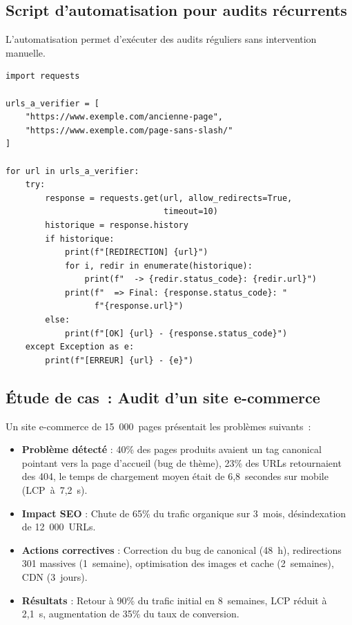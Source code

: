 \documentclass[12pt,a4paper,twoside]{report}
\begin{document}
\subsection{Script d'automatisation pour audits récurrents}

L'automatisation permet d'exécuter des audits réguliers sans intervention manuelle.

\begin{lstlisting}[style=code,caption={Script Python pour vérification automatisée des redirections}]
import requests

urls_a_verifier = [
    "https://www.exemple.com/ancienne-page",
    "https://www.exemple.com/page-sans-slash/"
]

for url in urls_a_verifier:
    try:
        response = requests.get(url, allow_redirects=True,
                                timeout=10)
        historique = response.history
        if historique:
            print(f"[REDIRECTION] {url}")
            for i, redir in enumerate(historique):
                print(f"  -> {redir.status_code}: {redir.url}")
            print(f"  => Final: {response.status_code}: "
                  f"{response.url}")
        else:
            print(f"[OK] {url} - {response.status_code}")
    except Exception as e:
        print(f"[ERREUR] {url} - {e}")
\end{lstlisting}

\subsection{Étude de cas~: Audit d'un site e-commerce}

Un site e-commerce de 15~000~pages présentait les problèmes suivants~:
\begin{itemize}
    \item \textbf{Problème détecté} : 40\% des pages produits avaient un tag canonical pointant vers la page d'accueil (bug de thème), 23\% des URLs retournaient des 404, le temps de chargement moyen était de 6,8~secondes sur mobile (LCP~à~7,2~s).
    \item \textbf{Impact SEO} : Chute de 65\% du trafic organique sur 3~mois, désindexation de 12~000~URLs.
    \item \textbf{Actions correctives} : Correction du bug de canonical (48~h), redirections 301 massives (1~semaine), optimisation des images et cache (2~semaines), CDN (3~jours).
    \item \textbf{Résultats} : Retour à 90\% du trafic initial en 8~semaines, LCP réduit à 2,1~s, augmentation de 35\% du taux de conversion.
\end{itemize}
\end{document}
